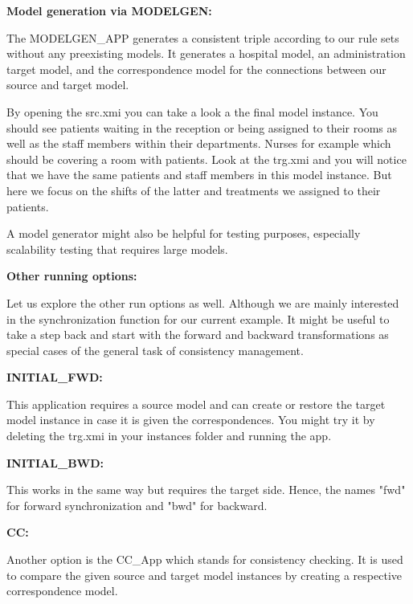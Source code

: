 {\textbf{Model generation via MODELGEN:}

The \textsf{MODELGEN\_APP} generates a consistent triple according to our rule sets without any preexisting models. It generates a hospital model, an administration target model, and the correspondence model for the connections between our source and target model.\newline

By opening the \textsf{src.xmi} you can take a look a the final model instance. You should see patients waiting in the reception or being assigned to their rooms as well as the staff members within their departments. Nurses for example which should be covering a room with patients. Look at the \textsf{trg.xmi} and you will notice that we have the same patients and staff members in this model instance. But here we focus on the shifts of the latter and treatments we assigned to their patients.

A model generator might also be helpful for testing purposes, especially scalability testing that requires large models. \newline

\textbf{Other running options:}

Let us explore the other run options as well. Although we are mainly interested in the synchronization function for our current example. It might be useful to take a step back and start with the forward and backward transformations as special cases of the general task of consistency management.\newline

\textbf{INITIAL\_FWD:}

This application requires a source model and can create or restore the target model instance in case it is given the correspondences. You might try it by deleting the \textsf{trg.xmi} in your instances folder and running the app.\newline

\textbf{INITIAL\_BWD:}

This works in the same way but requires the target side. Hence, the names \textsf{"fwd"} for forward synchronization and \textsf{"bwd"} for backward.\newline

\textbf{CC:}

Another option is the \textsf{CC\_App} which stands for consistency checking. It is used to compare the given source and target model instances by creating a respective correspondence model. \newline

}
